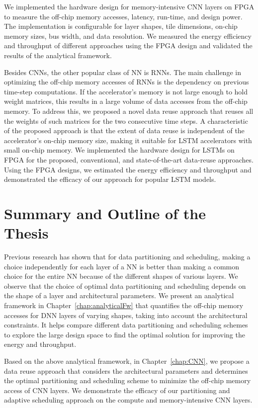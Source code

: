 We implemented the hardware design for memory-intensive CNN layers on FPGA to measure the off-chip memory accesses, latency, run-time, and design power. The implementation is configurable for layer shapes, tile dimensions, on-chip memory sizes, bus width, and data resolution. We measured the energy efficiency and throughput of different approaches using the FPGA design and validated the results of the analytical framework.

Besides CNNs, the other popular class of NN is RNNs. The main challenge in optimizing the off-chip memory accesses of RNNs is the dependency on previous time-step computations. If the accelerator's memory is not large enough to hold weight matrices, this results in a large volume of data accesses from the off-chip memory. To address this, we proposed a novel data reuse approach that reuses all the weights of such matrices for the two consecutive time steps. A characteristic of the proposed approach is that the extent of data reuse is independent of the accelerator's on-chip memory size, making it suitable for LSTM accelerators with small on-chip memory. We implemented the hardware design for LSTMs on FPGA for the proposed, conventional, and state-of-the-art data-reuse approaches. Using the FPGA designs, we estimated the energy efficiency and throughput and demonstrated the efficacy of our approach for popular LSTM models.
\section{Summary and Outline of the Thesis} 
Previous research has shown that for data partitioning and scheduling, making a choice independently for each layer of a NN is better than making a common choice for the entire NN because of the different shapes of various layers. We observe that the choice of optimal data partitioning and scheduling depends on the shape of a layer and architectural parameters. We present an analytical framework in Chapter~\ref{chap:analyticalFw} that quantifies the off-chip memory accesses for DNN layers of varying shapes, taking into account the architectural constraints. It helps compare different data partitioning and scheduling schemes to explore the large design space to find the optimal solution for improving the energy and throughput. 

Based on the above analytical framework, in Chapter~\ref{chap:CNN}, we propose a data reuse approach that considers the architectural parameters and determines the optimal partitioning and scheduling scheme to minimize the off-chip memory access of CNN layers. We demonstrate the efficacy of our partitioning and adaptive scheduling approach on the compute and memory-intensive CNN layers. 

